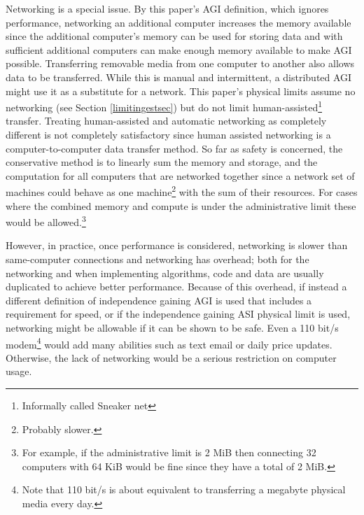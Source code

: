 \documentclass[letterpaper,twocolumn]{article}
\begin{document}
Networking is a special issue. By this paper's AGI definition, which
ignores performance, networking an additional computer increases the
memory available since the additional computer's memory can be used
for storing data and with sufficient additional computers can make
enough memory available to make AGI possible. Transferring removable
media from one computer to another also allows data to be transferred.
While this is manual and intermittent, a distributed AGI might use it
as a substitute for a network. This paper's physical limits assume no
networking (see Section \ref{limitingestsec}) but do not limit
human-assisted\footnote{Informally called Sneaker net}
transfer. Treating human-assisted and automatic networking as
completely different is not completely satisfactory since human
assisted networking is a computer-to-computer data transfer method.
So far as safety is concerned, the conservative method is to linearly
sum the memory and storage, and the computation for all computers that
are networked together since a network set of machines could behave as
one machine\footnote{Probably slower.} with the sum of their
resources. For cases where the combined memory and compute is under
the administrative limit these would be allowed.\footnote{For example,
if the administrative limit is 2 MiB then connecting 32 computers with
64 KiB would be fine since they have a total of 2 MiB.}

However, in practice, once performance is considered, networking is
slower than same-computer connections and networking has overhead;
both for the networking and when implementing algorithms, code and
data are usually duplicated to achieve better performance. Because of
this overhead, if instead a different definition of independence
gaining AGI is used that includes a requirement for speed, or if the
independence gaining ASI physical limit is used, networking might be
allowable if it can be shown to be safe. Even a 110 bit/s
modem\footnote{Note that 110 bit/s is about equivalent to transferring
a megabyte physical media every day.}  would add many abilities such
as text email or daily price updates. Otherwise, the lack of
networking would be a serious restriction on computer usage.

\end{document}
